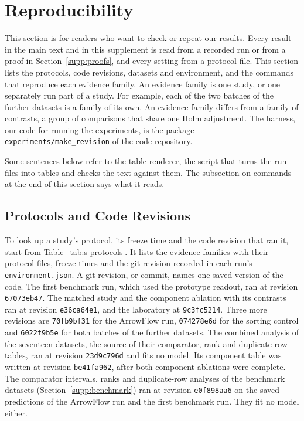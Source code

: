 \section{Reproducibility}\label{supp:reproducibility}

This section is for readers who want to check or repeat our results. Every result in the main text and in this supplement is read from a recorded run or from a proof in Section~\ref{supp:proofs}, and every setting from a protocol file. This section lists the protocols, code revisions, datasets and environment, and the commands that reproduce each evidence family. An evidence family is one study, or one separately run part of a study. For example, each of the two batches of the further datasets is a family of its own. An evidence family differs from a family of contrasts, a group of comparisons that share one Holm adjustment. The harness, our code for running the experiments, is the package \texttt{experiments/make\_revision} of the code repository.

Some sentences below refer to the table renderer, the script that turns the run files into tables and checks the text against them. The subsection on commands at the end of this section says what it reads.

\FloatBarrier
\subsection{Protocols and Code Revisions}\label{supp:protocols}

{\sloppy To look up a study's protocol, its freeze time and the code revision that ran it, start from Table~\ref{tab:s-protocols}. It lists the evidence families with their protocol files, freeze times and the git revision recorded in each run's \texttt{environment.json}. A git revision, or commit, names one saved version of the code. The first benchmark run, which used the prototype readout, ran at revision \texttt{67073eb47}. The matched study and the component ablation with its contrasts ran at revision \texttt{e36ca64e1}, and the laboratory at \texttt{9c3fc5214}. Three more revisions are \texttt{70fb9bf31} for the ArrowFlow run, \texttt{074278e6d} for the sorting control and \texttt{6022f9b5e} for both batches of the further datasets. The combined analysis of the seventeen datasets, the source of their comparator, rank and duplicate-row tables, ran at revision \texttt{23d9c796d} and fits no model. Its component table was written at revision \texttt{be41fa962}, after both component ablations were complete. The comparator intervals, ranks and duplicate-row analyses of the benchmark datasets (Section~\ref{supp:benchmark}) ran at revision \texttt{e0f898aa6} on the saved predictions of the ArrowFlow run and the first benchmark run. They fit no model either.\par}


